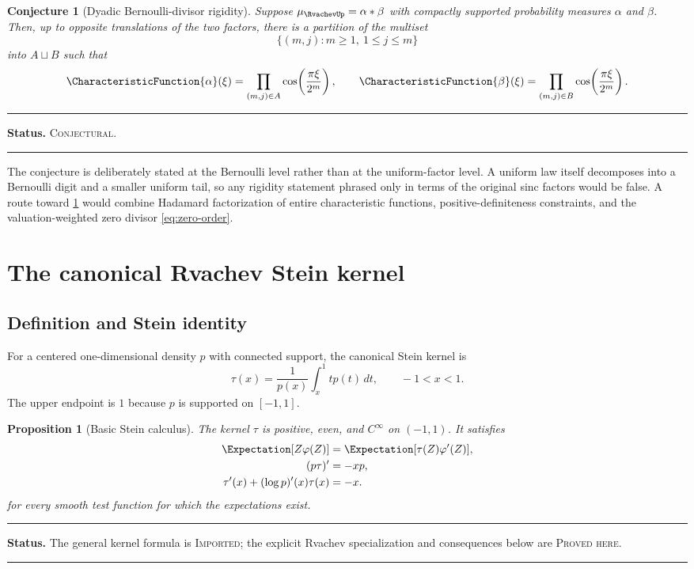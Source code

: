 \documentclass[11pt,oneside]{article}
\newtheorem{proposition}[theorem]{Proposition}
\newtheorem{conjecture}[theorem]{Conjecture}
\theoremstyle{definition}
\theoremstyle{remark}
\newenvironment{boxedremark}{%
  \par\smallskip\noindent\begin{center}\begin{minipage}{0.94\textwidth}%
  \color{black}\hrule\vspace{0.6em}\small
}{%
  \vspace{0.6em}\hrule\end{minipage}\end{center}\smallskip
}
\newcommand{\Imported}{\textsc{Imported}}
\newcommand{\ProvedHere}{\textsc{Proved here}}
\newcommand{\Conjectural}{\textsc{Conjectural}}
\newcommand{\Status}[1]{%
  \begin{boxedremark}\textbf{Status.} #1.\end{boxedremark}}
\begin{document}
\begin{conjecture}[Dyadic Bernoulli-divisor rigidity]\label{conj:factor-rigidity}
Suppose $\mu_{\RvachevUp}=\alpha*\beta$ with compactly supported probability measures
$\alpha$ and $\beta$.  Then, up to opposite translations of the two factors,
there is a partition of the multiset
\[
 \{(m,j):m\ge1,\ 1\le j\le m\}
\]
into $A\sqcup B$ such that
\[
 \CharacteristicFunction{\alpha}(\xi)=\prod_{(m,j)\in A}
 \cos\!\left(\frac{\pi\xi}{2^m}\right),\qquad
 \CharacteristicFunction{\beta}(\xi)=\prod_{(m,j)\in B}
 \cos\!\left(\frac{\pi\xi}{2^m}\right).
\]
\end{conjecture}
\Status{\Conjectural}

The conjecture is deliberately stated at the Bernoulli level rather than at the
uniform-factor level.  A uniform law itself decomposes into a Bernoulli digit and
a smaller uniform tail, so any rigidity statement phrased only in terms of the
original sinc factors would be false.  A route toward \cref{conj:factor-rigidity}
would combine Hadamard factorization of entire characteristic functions,
positive-definiteness constraints, and the valuation-weighted zero divisor
\eqref{eq:zero-order}.

\section{The canonical Rvachev Stein kernel}

\subsection{Definition and Stein identity}
For a centered one-dimensional density $p$ with connected support, the canonical
Stein kernel is
\begin{equation}\label{eq:stein-def}
 \tau(x)=\frac{1}{p(x)}\int_x^1 t p(t)\,dt,
 \qquad -1<x<1.
\end{equation}
The upper endpoint is $1$ because $p$ is supported on $[-1,1]$.

\begin{proposition}[Basic Stein calculus]\label{prop:stein-basic}
The kernel $\tau$ is positive, even, and $C^\infty$ on $(-1,1)$.  It satisfies
\begin{align}
 \Expectation[Z\varphi(Z)]&=\Expectation[\tau(Z)\varphi'(Z)],\label{eq:stein-identity}\\
 (p\tau)'&=-xp,\label{eq:stein-conservative}\\
 \tau'(x)+(\log p)'(x)\tau(x)&=-x.\label{eq:stein-ode}
\end{align}
for every smooth test function for which the expectations exist.
\end{proposition}
\Status{The general kernel formula is \Imported; the explicit Rvachev
specialization and consequences below are \ProvedHere}
\end{document}
